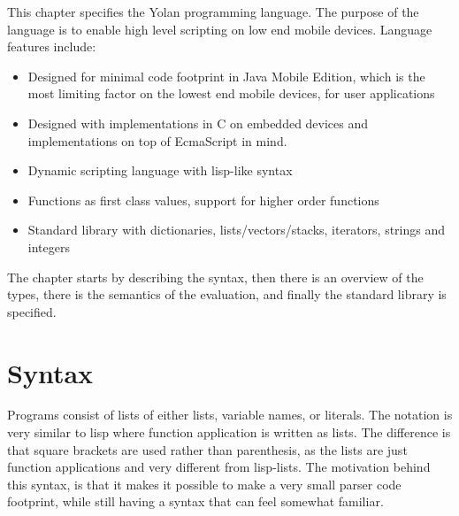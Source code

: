 This chapter specifies the Yolan programming language.
The purpose of the language is to enable high level scripting on low end mobile devices. Language features include:
\begin{itemize}
\item Designed for minimal code footprint in Java Mobile Edition, which is the most limiting factor on the lowest end mobile devices, for user applications
\item Designed with implementations in C on embedded devices and implementations on top of EcmaScript in mind.
\item Dynamic scripting language with lisp-like syntax
\item Functions as first class values, support for higher order functions
\item Standard library with dictionaries, lists/vectors/stacks, iterators, strings and integers
\end{itemize}

The chapter starts by describing the syntax, then there is an overview of the types, there is the semantics of the evaluation, and finally the standard library is specified.


\section{Syntax}
Programs consist of lists of either lists, variable names, or literals.
The notation is very similar to lisp where function application is written as lists.
The difference is that square brackets are used rather than parenthesis, 
as the lists are just function applications and very different from lisp-lists.
The motivation behind this syntax, is that it makes it possible to make a very small parser code footprint, while still having a syntax that can feel somewhat familiar.

